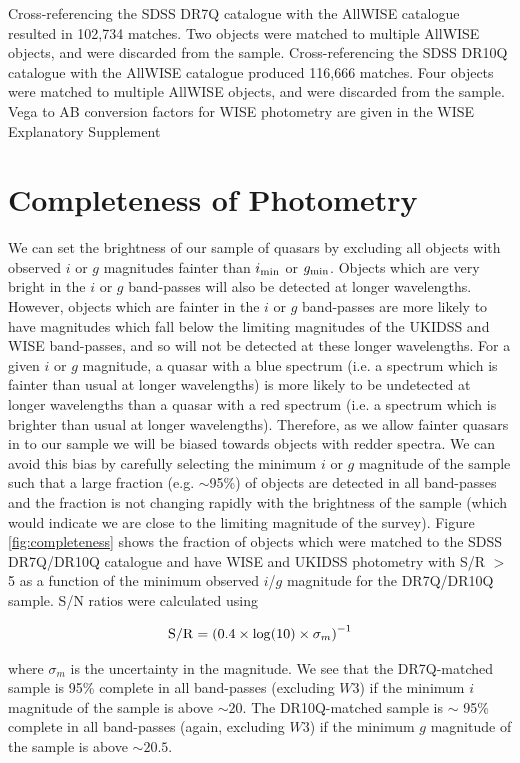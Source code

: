 Cross-referencing the SDSS DR7Q catalogue with the AllWISE catalogue resulted in 102,734 matches. 
Two objects were matched to multiple AllWISE objects, and were discarded from the sample. 
Cross-referencing the SDSS DR10Q catalogue with the AllWISE catalogue produced 116,666 matches. 
Four objects were matched to multiple AllWISE objects, and were discarded from the sample. 
Vega to AB conversion factors for WISE photometry are given in the WISE Explanatory Supplement \citep{cutri13}

\section{Completeness of Photometry}

We can set the brightness of our sample of quasars by excluding all objects with observed $i$ or $g$ magnitudes fainter than $i_{\rm min}$ or $g_{\rm min}$. 
Objects which are very bright in the $i$ or $g$ band-passes will also be detected at longer wavelengths. 
However, objects which are fainter in the $i$ or $g$ band-passes are more likely to have magnitudes which fall below the limiting magnitudes of the UKIDSS and WISE band-passes, and so will not be detected at these longer wavelengths. 
For a given $i$ or $g$ magnitude, a quasar with a blue spectrum (i.e. a spectrum which is fainter than usual at longer wavelengths) is more likely to be undetected at longer wavelengths than a quasar with a red spectrum (i.e. a spectrum which is brighter than usual at longer wavelengths). Therefore, as we allow fainter quasars in to our sample we will be biased towards objects with redder spectra. 
We can avoid this bias by carefully selecting the minimum $i$ or $g$ magnitude of the sample such that a large fraction (e.g. $\sim$95\%) of objects are detected in all band-passes and the fraction is not changing rapidly with the brightness of the sample (which would indicate we are close to the limiting magnitude of the survey). Figure \ref{fig:completeness} shows the fraction of objects which were matched to the SDSS DR7Q/DR10Q catalogue and have WISE and UKIDSS photometry with S/R $>$ 5 as a function of the minimum observed $i$/$g$ magnitude for the DR7Q/DR10Q sample. 
S/N ratios were calculated using

\begin{eqnarray}
  {\rm S/R} = \left( 0.4 \times {\rm log}(10) \times \sigma_m \right)^{-1}
\end{eqnarray}

where $\sigma_m$ is the uncertainty in the magnitude. 
We see that the DR7Q-matched sample is 95\% complete in all band-passes (excluding $W3$) if the minimum $i$ magnitude of the sample is above $\sim 20$. 
The DR10Q-matched sample is $\sim$ 95\% complete in all band-passes (again, excluding $W3$) if the minimum $g$ magnitude of the sample is above $\sim 20.5$. 

